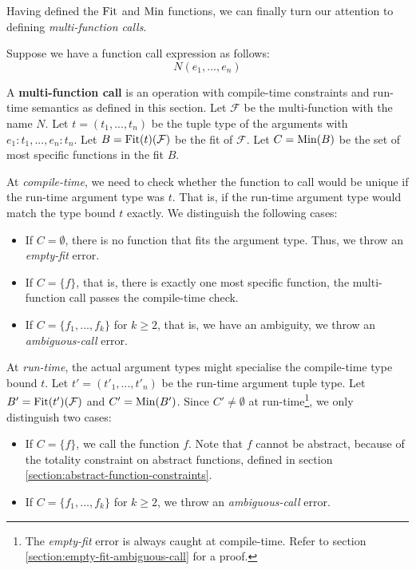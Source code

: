 \bigskip

\noindent Having defined the $\operatorname{Fit}$ and $\operatorname{Min}$ functions, we can finally turn our attention to defining \textit{multi-function calls}.

\begin{definition}
	Suppose we have a function call expression as follows:
	\begin{equation*}
		N(e_1, ..., e_n)
	\end{equation*}
	
	\noindent A \textbf{multi-function call} is an operation with compile-time constraints and run-time semantics as defined in this section. Let $\mathcal{F}$ be the multi-function with the name $N$. Let $t = (t_1, ..., t_n)$ be the tuple type of the arguments with $e_1 : t_1, ..., e_n : t_n$. Let $B = \operatorname{Fit}(t)(\mathcal{F})$ be the fit of $\mathcal{F}$. Let $C = \operatorname{Min}(B)$ be the set of most specific functions in the fit $B$. 
	
	At \textit{compile-time}, we need to check whether the function to call would be unique if the run-time argument type was $t$. That is, if the run-time argument type would match the type bound $t$ exactly. We distinguish the following cases:
	\begin{itemize}
		\item If $C = \emptyset$, there is no function that fits the argument type. Thus, we throw an \textit{empty-fit} error.
		\item If $C = \{ f \}$, that is, there is exactly one most specific function, the multi-function call passes the compile-time check.
		\item If $C = \{ f_1, ..., f_k \}$ for $k \geq 2$, that is, we have an ambiguity, we throw an \textit{ambiguous-call} error.
	\end{itemize}
	
	\noindent At \textit{run-time}, the actual argument types might specialise the compile-time type bound $t$. Let $t' = (t'_1, ..., t'_n)$ be the run-time argument tuple type. Let $B' = \operatorname{Fit}(t')(\mathcal{F})$ and $C' = \operatorname{Min}(B')$. Since $C' \neq \emptyset$ at run-time\footnote{The \textit{empty-fit} error is always caught at compile-time. Refer to section \ref{section:empty-fit-ambiguous-call} for a proof.}, we only distinguish two cases:
	\begin{itemize}
		\item If $C = \{ f \}$, we call the function $f$. Note that $f$ cannot be abstract, because of the totality constraint on abstract functions, defined in section \ref{section:abstract-function-constraints}.
		\item If $C = \{ f_1, ..., f_k \}$ for $k \geq 2$, we throw an \textit{ambiguous-call} error.
	\end{itemize}
\end{definition}

